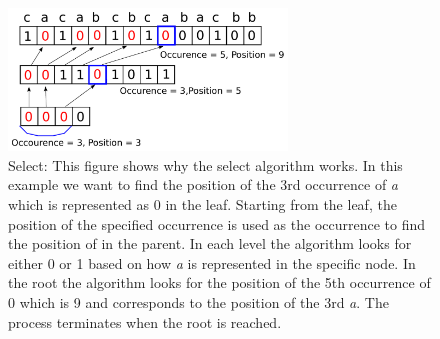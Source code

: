 \begin{figure}
\center \includegraphics[width=0.66\textwidth]{SelectDrawing}
\caption{Select: This figure shows why the select algorithm works. 
In this example we want to find the position of the 3rd occurrence of \textit{a} which is represented as 0 in the leaf.
Starting from the leaf, the position of the specified occurrence is used as the occurrence to find the position of in the parent. 
In each level the algorithm looks for either 0 or 1 based on how \textit{a} is represented in the specific node.
In the root the algorithm looks for the position of the 5th occurrence of 0 which is 9 and corresponds to the position of the 3rd \textit{a}.
The process terminates when the root is reached.}
\label{fig:SelectDrawing}
\end{figure}

